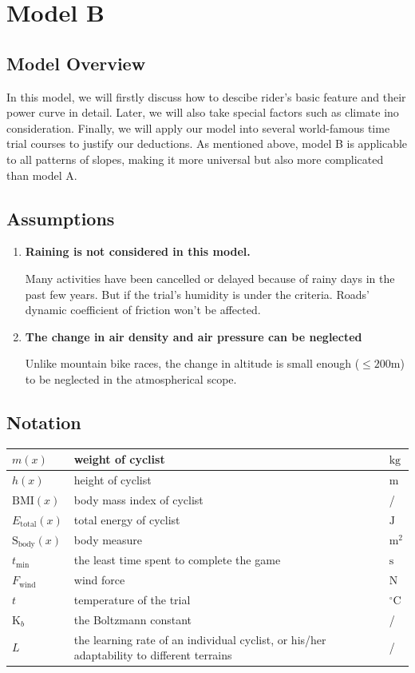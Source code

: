 \documentclass{article}
\begin{document}
	\section{Model B}
		\subsection{Model Overview}
			In this model, we will firstly discuss how to descibe rider's basic feature and their power curve in detail. Later, we will also take special factors such as climate ino consideration. Finally, we will apply our model into several world-famous time trial courses to justify our deductions. As mentioned above, model B is applicable to all patterns of slopes, making it more universal but also more complicated than model A.
		\subsection{Assumptions}
			\begin{enumerate}
				\item	\textbf{Raining is not considered in this model.}

						Many activities have been cancelled or delayed because of rainy days in the past few years. But if the trial's humidity is under the criteria. Roads' dynamic coefficient of friction won't be affected.
				\item \textbf{The change in air density and air pressure can be neglected}

						Unlike mountain bike races, the change in altitude is small enough (\(\leq 200\mathrm{m}\)) to be neglected in the atmospherical scope.

			\end{enumerate}
		\subsection{Notation}
			\begin{tabular}{|l|l|l|}
				\hline
				$m( x )$&weight of cyclist&$\mathrm{kg}$\\
				\hline
				$ h ( x )$&height of cyclist&$\mathrm{m}$\\
				\hline
				$\mathrm{BMI}( x )$&body mass index of cyclist&/\\
				\hline
				$ E _\mathrm{total} ( x )$&total energy of cyclist&$\mathrm{J}$\\
				\hline
				$\mathrm{S}_\mathrm{body}( x )$&body measure&$\mathrm{m}^2$\\
				\hline
				$t_\mathrm{min}$&the least time spent to complete the game&$\mathrm{s}$\\
				\hline
				$F_\mathrm{wind}$&wind force&$\mathrm{N}$\\
				\hline
				$t$&temperature of the trial&$^\circ\mathrm{C}$\\
				\hline
				$\mathrm{K}_ b $&the Boltzmann constant&/\\
				\hline
				\(L\) & the learning rate of an individual cyclist, or his/her adaptability to different terrains & /\\
				\hline
			\end{tabular}
\end{document}
